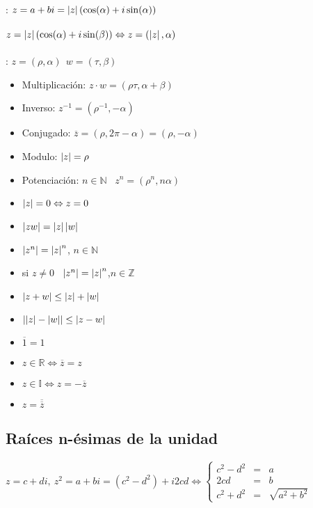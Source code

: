 \documentclass[a4paper,10pt]{article}
\begin{document}
: $z = a + bi = \left\lvert z\right\rvert (\cos(\alpha)+ i \sin (\alpha))$ \\ \\

\notacion $z = \left\lvert z\right\rvert (\cos(\alpha)+ i \sin (\beta)) \Leftrightarrow z=(\left\lvert z\right\rvert,\alpha)$ \\ \\

: $z=(\rho,\alpha) \ \ w=(\tau,\beta)$
\begin{itemize}
	\item Multiplicación: $z \cdot w = (\rho \tau, \alpha + \beta)$
	\item Inverso: $z^{-1} = (\rho^{-1},-\alpha)$
	\item Conjugado: $\overline{z} = (\rho,2\pi - \alpha) = (\rho,-\alpha)$ 
	\item Modulo: $\left\lvert z\right\rvert = \rho$
	\item Potenciación: $n \in \mathbb{N}$ \ $z^{n} = (\rho^{n},n\alpha)$
\end{itemize}


\begin{itemize}
	\item $\left\lvert z\right\rvert = 0 \Leftrightarrow z = 0$
	\item $\left\lvert zw\right\rvert = \left\lvert z\right\rvert \left\lvert w\right\rvert$
	\item $\left\lvert z^{n}\right\rvert=\left\lvert z\right\rvert^{n}$, $n \in \mathbb{N}$
	\item si $z \neq 0$ \ $\left\lvert z^{n}\right\rvert=\left\lvert z\right\rvert^{n}$,$n \in \mathbb{Z}$
	\item $\left\lvert z+w\right\rvert \leq \left\lvert z\right\rvert + \left\lvert w\right\rvert$
	\item $\left\lvert\left\lvert z\right\rvert-\left\lvert w\right\rvert\right\rvert \leq \left\lvert z-w\right\rvert$
	\item $\overline{1} = 1$
	\item $z \in \mathbb{R} \Leftrightarrow \overline{z} = z$
	\item $z \in \mathbb{I} \Leftrightarrow z = -\overline{z}$
	\item $z = \overline{\overline{z}}$
\end{itemize}


\subsection {Raíces n-ésimas de la unidad}


 $z = c+di, \ z^{2} = a+bi = (c^{2}-d^{2})+i2cd \Leftrightarrow 
\left\{
\begin{array}{rcl}
     c^{2} - d^{2} & = & a
  \\ 2cd & = & b
  \\ c^{2} + d^{2} & = & \sqrt {a^{2}+b^{2}}
\end{array}
\right.$ \\ \\
\end{document}
